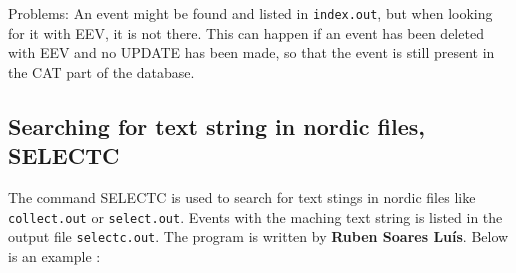 Problems: An event might be found and listed in 
\texttt{index.out}, but when looking for it with EEV, it is not there. 
This can happen if an event has been deleted with EEV and no UPDATE 
has been made, so that the event is still present in the CAT part of the database. 


\subsection{Searching for text string in nordic files, SELECTC}
\label{page:selectc.jar}

The command SELECTC is used to search for text stings in nordic files 
like \texttt{collect.out} or \texttt{select.out}. Events with the maching 
text string is listed in the output file 
\texttt{selectc.out}. 
The program is written by \textbf{Ruben Soares Lu\'is}.
Below is an example :



